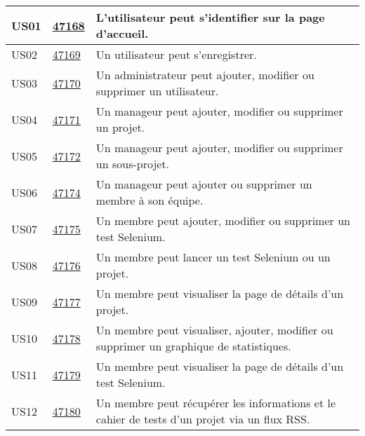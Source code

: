 \begin{center}
    \begin{tabular}{|l|p{1.5cm}|p{14cm}|}
        \hline
US01	&	\href{https://redmine-projets.smile.fr/issues/47168}{47168}	&	L'utilisateur peut s'identifier sur la page d'accueil.	                                        \\
        \hline
US02	&	\href{https://redmine-projets.smile.fr/issues/47169}{47169}	&	Un utilisateur peut s'enregistrer.	                                                            \\
        \hline
US03	&	\href{https://redmine-projets.smile.fr/issues/47170}{47170}	&	Un administrateur peut ajouter, modifier ou supprimer un utilisateur.	                        \\
        \hline
US04	&	\href{https://redmine-projets.smile.fr/issues/47171}{47171}	&	Un manageur peut ajouter, modifier ou supprimer un projet.	                                    \\
        \hline
US05	&	\href{https://redmine-projets.smile.fr/issues/47172}{47172}	&	Un manageur peut ajouter, modifier ou supprimer un sous-projet.	                                \\
        \hline
US06	&	\href{https://redmine-projets.smile.fr/issues/47174}{47174}	&	Un manageur peut ajouter ou supprimer un membre à son équipe.	                                \\
        \hline
US07	&	\href{https://redmine-projets.smile.fr/issues/47175}{47175}	&	Un membre peut ajouter, modifier ou supprimer un test Selenium.	                                \\
        \hline
US08	&	\href{https://redmine-projets.smile.fr/issues/47176}{47176}	&	Un membre peut lancer un test Selenium ou un projet.	                                        \\
        \hline
US09	&	\href{https://redmine-projets.smile.fr/issues/47177}{47177}	&	Un membre peut visualiser la page de détails d'un projet.	                                    \\
        \hline
US10	&	\href{https://redmine-projets.smile.fr/issues/47178}{47178}	&	Un membre peut visualiser, ajouter, modifier ou supprimer un graphique de statistiques.	        \\
        \hline
US11	&	\href{https://redmine-projets.smile.fr/issues/47179}{47179}	&	Un membre peut visualiser la page de détails d'un test Selenium.	                                \\
        \hline
US12	&	\href{https://redmine-projets.smile.fr/issues/47180}{47180}	&	Un membre peut récupérer les informations et le cahier de tests d'un projet via un flux RSS.	                \\

\end{tabular}
\end{center}
